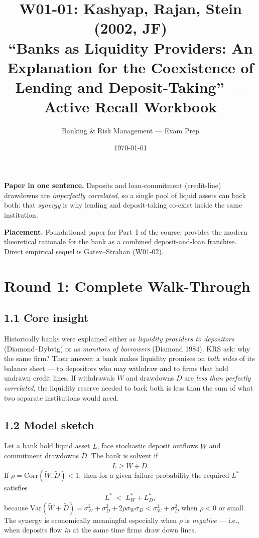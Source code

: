 \documentclass[11pt]{article}
\title{W01-01: Kashyap, Rajan, Stein (2002, JF) \\
\large ``Banks as Liquidity Providers: An Explanation for the Coexistence of Lending and Deposit-Taking'' --- Active Recall Workbook}
\author{Banking \& Risk Management --- Exam Prep}
\date{\today}
\newcommand{\Var}{\mathrm{Var}}
\begin{document}
\maketitle

\begin{keybox}
\textbf{Paper in one sentence.} Deposits and loan-commitment (credit-line) drawdowns are \emph{imperfectly correlated}, so a single pool of liquid assets can back both: that \emph{synergy} is why lending and deposit-taking co-exist inside the same institution.

\textbf{Placement.} Foundational paper for Part~I of the course: provides the modern theoretical rationale for the bank as a combined deposit-and-loan franchise. Direct empirical sequel is Gatev--Strahan (W01-02).
\end{keybox}

\section*{Round 1: Complete Walk-Through}

\subsection*{1.1 Core insight}
Historically banks were explained either as \emph{liquidity providers to depositors} (Diamond--Dybvig) or as \emph{monitors of borrowers} (Diamond 1984). KRS ask: why the same firm? Their answer: a bank makes liquidity promises on \emph{both sides} of its balance sheet --- to depositors who may withdraw and to firms that hold undrawn credit lines. If withdrawals $W$ and drawdowns $D$ are \emph{less than perfectly correlated}, the liquidity reserve needed to back both is less than the sum of what two separate institutions would need.

\subsection*{1.2 Model sketch}
Let a bank hold liquid asset $L$, face stochastic deposit outflows $\tilde W$ and commitment drawdowns $\tilde D$. The bank is solvent if
\[
L \ge \tilde W + \tilde D.
\]
If $\rho = \text{Corr}(\tilde W, \tilde D) < 1$, then for a given failure probability the required $L^*$ satisfies
\[
L^* \;<\; L^*_W + L^*_D,
\]
because $\Var(\tilde W + \tilde D) = \sigma_W^2 + \sigma_D^2 + 2\rho\sigma_W\sigma_D < \sigma_W^2 + \sigma_D^2$ when $\rho<0$ or small. The synergy is economically meaningful especially when $\rho$ is \emph{negative} --- i.e., when deposits flow \emph{in} at the same time firms draw down lines.
\end{document}
